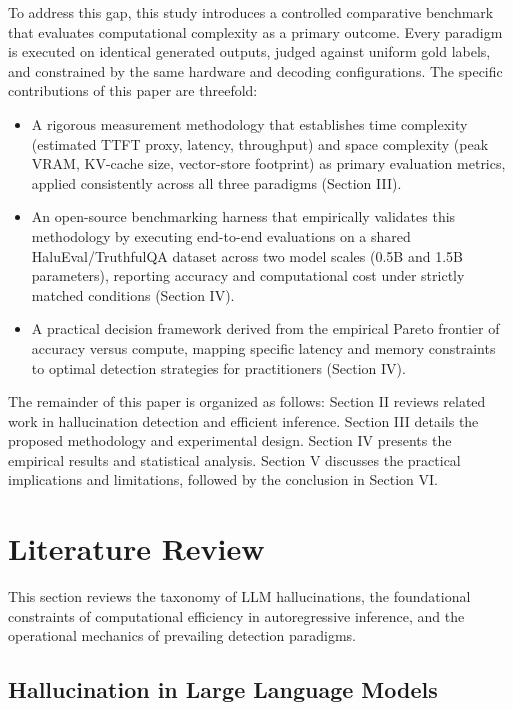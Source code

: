\documentclass[conference]{IEEEtran}
\begin{document}
To address this gap, this study introduces a controlled comparative benchmark that evaluates computational complexity as a primary outcome. Every paradigm is executed on identical generated outputs, judged against uniform gold labels, and constrained by the same hardware and decoding configurations. The specific contributions of this paper are threefold:
\begin{itemize}
    \item A rigorous measurement methodology that establishes time complexity (estimated TTFT proxy, latency, throughput) and space complexity (peak VRAM, KV-cache size, vector-store footprint) as primary evaluation metrics, applied consistently across all three paradigms (Section III).
    \item An open-source benchmarking harness that empirically validates this methodology by executing end-to-end evaluations on a shared HaluEval/TruthfulQA dataset across two model scales (0.5B and 1.5B parameters), reporting accuracy and computational cost under strictly matched conditions (Section IV).
    \item A practical decision framework derived from the empirical Pareto frontier of accuracy versus compute, mapping specific latency and memory constraints to optimal detection strategies for practitioners (Section IV).
\end{itemize}

The remainder of this paper is organized as follows: Section II reviews related work in hallucination detection and efficient inference. Section III details the proposed methodology and experimental design. Section IV presents the empirical results and statistical analysis. Section V discusses the practical implications and limitations, followed by the conclusion in Section VI.

\section{Literature Review}

This section reviews the taxonomy of LLM hallucinations, the foundational constraints of computational efficiency in autoregressive inference, and the operational mechanics of prevailing detection paradigms.

\subsection{Hallucination in Large Language Models}
\end{document}
